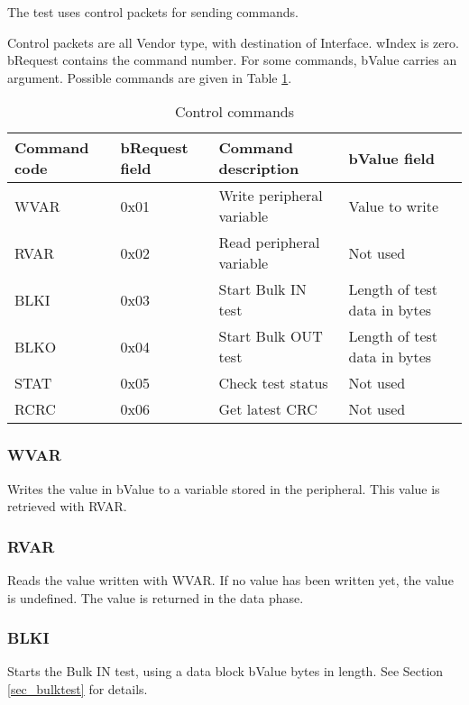 \documentclass{book}
\begin{document}
The test uses control packets for sending commands.

Control packets are all Vendor type, with destination of Interface.  wIndex is zero.  bRequest contains the command number.  For some commands, bValue carries an argument.  Possible commands are given in Table \ref{tbl_control_commands}.

\begin{table}
\begin{tabularx}{\textwidth}{|p{1.5cm}|p{1.5cm}|X|X|}
\hline
Command code & bRequest field & Command description & bValue field \\ 
\hline
\hline
WVAR & 0x01 & Write peripheral variable & Value to write \\ 
\hline
RVAR & 0x02 & Read peripheral variable & Not used \\ 
\hline
BLKI & 0x03 & Start Bulk IN test & Length of test data in bytes \\ 
\hline
BLKO & 0x04 & Start Bulk OUT test & Length of test data in bytes \\ 
\hline
STAT & 0x05 & Check test status & Not used \\ 
\hline
RCRC & 0x06 & Get latest CRC & Not used \\ 
\hline
\end{tabularx}
\caption{Control commands}
\label{tbl_control_commands}
\end{table}

\subsubsection{WVAR}

Writes the value in bValue to a variable stored in the peripheral.  This value is retrieved with RVAR.

\subsubsection{RVAR}

Reads the value written with WVAR.  If no value has been written yet, the value is undefined.  The value is returned in the data phase.

\subsubsection{BLKI}

Starts the Bulk IN test, using a data block bValue bytes in length.  See Section \ref{sec_bulktest} for details.
\end{document}
